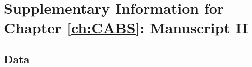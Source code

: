 \chapter{Supplementary Information for Chapter \ref{ch:CABS}: Manuscript II}
\label{appendix: CABS}
\acresetall

\section{Data}
